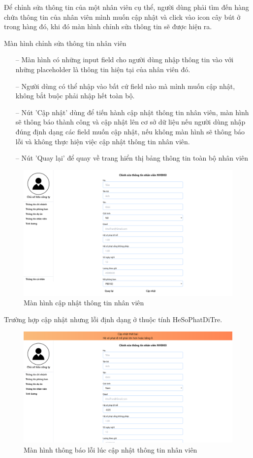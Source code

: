 Để chỉnh sửa thông tin của một nhân viên cụ thể, người dùng phải tìm đến hàng chứa thông tin của nhân viên mình muốn cập nhật và click vào icon cây bút ở trong hàng đó, khi đó màn hình chỉnh sửa thông tin sẽ được hiện ra.

Màn hình chỉnh sửa thông tin nhân viên
\begin{itemize}
    \item [--] Màn hình có những input field cho người dùng nhập thông tin vào với những placeholder là thông tin hiện tại của nhân viên đó.
    \item [--] Người dùng có thể nhập vào bất cứ field nào mà mình muốn cập nhật, không bắt buộc phải nhập hết toàn bộ.
    \item [--] Nút 'Cập nhật' dùng để tiến hành cập nhật thông tin nhân viên, màn hình sẽ thông báo thành công và cập nhật lên cơ sở dữ liệu nếu người dùng nhập đúng định dạng các field muốn cập nhật, nếu không màn hình sẽ thông báo lỗi và không thực hiện việc cập nhật thông tin nhân viên.
    \item [--] Nút 'Quay lại' để quay về trang hiển thị bảng thông tin toàn bộ nhân viên
\end{itemize}
\begin{figure}[H]
    \centering
    \includegraphics[width=0.75\linewidth]{content/images/ManHinh_1_e.png}
    \caption{Màn hình cập nhật thông tin nhân viên}
    \label{fig:ManHinh_1_e}
\end{figure}

Trường hợp cập nhật nhưng lỗi định dạng ở thuộc tính HeSoPhatDiTre.
\begin{figure}[H]
    \centering
    \includegraphics[width=0.75\linewidth]{content/images/ManHinh_1_f.png}
    \caption{Màn hình thông báo lỗi lúc cập nhật thông tin nhân viên}
    \label{fig:ManHinh_1_f}
\end{figure}

